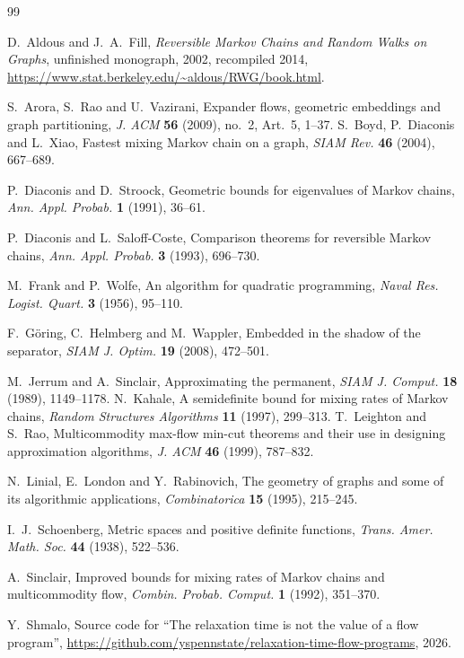 \documentclass[11pt]{amsart}
\theoremstyle{remark}
\numberwithin{equation}{section}
\begin{document}
\begin{thebibliography}{99}

D.~Aldous and J.~A.~Fill, \emph{Reversible Markov Chains and Random Walks on Graphs}, unfinished monograph, 2002, recompiled 2014, \url{https://www.stat.berkeley.edu/~aldous/RWG/book.html}.

S.~Arora, S.~Rao and U.~Vazirani, Expander flows, geometric embeddings and graph partitioning, \emph{J. ACM} \textbf{56} (2009), no.~2, Art.~5, 1--37.
 S.~Boyd, P.~Diaconis and L.~Xiao, Fastest mixing Markov chain on a graph, \emph{SIAM Rev.} \textbf{46} (2004), 667--689.

P.~Diaconis and D.~Stroock, Geometric bounds for eigenvalues of Markov chains, \emph{Ann. Appl. Probab.} \textbf{1} (1991), 36--61.

 P.~Diaconis and L.~Saloff-Coste, Comparison theorems for reversible Markov chains, \emph{Ann. Appl. Probab.} \textbf{3} (1993), 696--730.

M.~Frank and P.~Wolfe, An algorithm for quadratic programming, \emph{Naval Res. Logist. Quart.} \textbf{3} (1956), 95--110.

 F.~G\"oring, C.~Helmberg and M.~Wappler, Embedded in the shadow of the separator, \emph{SIAM J. Optim.} \textbf{19} (2008), 472--501.

M.~Jerrum and A.~Sinclair, Approximating the permanent, \emph{SIAM J. Comput.} \textbf{18} (1989), 1149--1178.
N.~Kahale, A semidefinite bound for mixing rates of Markov chains, \emph{Random Structures Algorithms} \textbf{11} (1997), 299--313.
T.~Leighton and S.~Rao, Multicommodity max-flow min-cut theorems and their use in designing approximation algorithms, \emph{J. ACM} \textbf{46} (1999), 787--832.

N.~Linial, E.~London and Y.~Rabinovich, The geometry of graphs and some of its algorithmic applications, \emph{Combinatorica} \textbf{15} (1995), 215--245.

I.~J.~Schoenberg, Metric spaces and positive definite functions, \emph{Trans. Amer. Math. Soc.} \textbf{44} (1938), 522--536.

A.~Sinclair, Improved bounds for mixing rates of Markov chains and multicommodity flow, \emph{Combin. Probab. Comput.} \textbf{1} (1992), 351--370.

Y.~Shmalo, Source code for ``The relaxation time is not the value of a flow program'', \url{https://github.com/yspennstate/relaxation-time-flow-programs}, 2026.


\end{thebibliography}
\end{document}
